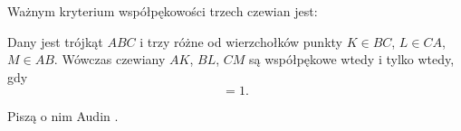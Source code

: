 Ważnym kryterium współpękowości trzech czewian jest:

\begin{proposition}
	Dany jest trójkąt $ABC$ i trzy różne od wierzchołków punkty $K \in BC$, $L \in CA$, $M \in AB$.
	Wówczas czewiany $AK$, $BL$, $CM$ są współpękowe wtedy i tylko wtedy, gdy
	\begin{equation}
		[AMB] [BKC] [CLA] = 1.
	\end{equation}
\end{proposition}

Piszą o nim Audin \cite[s. 38]{audin_2003}.